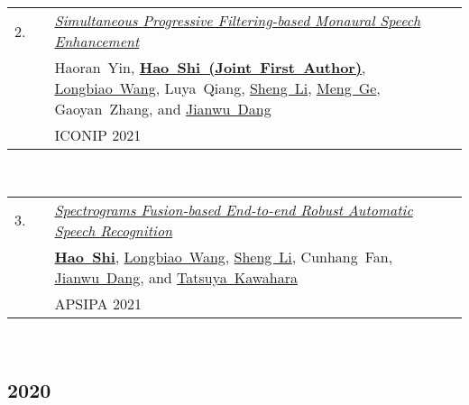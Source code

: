 \documentclass[11pt,letter,sans]{moderncv}
\begin{document}
\begin{minipage}{\textwidth}
\begin{tabular}{R{8mm}p{1mm}L{6.5in}}
 2.\hspace*{1mm} && \textit{\href{https://hshi-speech.github.io/resume/pdf/SaSD.pdf}{Simultaneous Progressive Filtering-based Monaural Speech Enhancement} }  \\
 && \mbox{Haoran Yin}, \mbox{\textbf{\href{https://scholar.google.com/citations?user=DclFbLwAAAAJ}{Hao Shi (Joint First Author)}}}, \mbox{\href{https://scholar.google.com/citations?user=1Z9_5ZgAAAAJ}{Longbiao Wang}}, \mbox{Luya Qiang}, \mbox{\href{https://scholar.google.com/citations?user=zHAhs0IAAAAJ}{Sheng Li}}, \mbox{\href{https://scholar.google.com/citations?user=Ody4GF0AAAAJ}{Meng Ge}}, \mbox{Gaoyan Zhang}, and \mbox{\href{https://scholar.google.com/citations?user=Wk5ApskAAAAJ}{Jianwu Dang}} \\
 && ICONIP 2021  \\
\end{tabular} \\[2mm]
\end{minipage}

\begin{minipage}{\textwidth}
\begin{tabular}{R{8mm}p{1mm}L{6.5in}}
 3.\hspace*{1mm} && \textit{\href{https://hshi-speech.github.io/resume/pdf/APSIPA-2021.pdf}{Spectrograms Fusion-based End-to-end Robust Automatic Speech Recognition} }  \\
 && \mbox{\textbf{\href{https://scholar.google.com/citations?user=DclFbLwAAAAJ}{Hao Shi}}}, \mbox{\href{https://scholar.google.com/citations?user=1Z9_5ZgAAAAJ}{Longbiao Wang}}, \mbox{\href{https://scholar.google.com/citations?user=zHAhs0IAAAAJ}{Sheng Li}}, \mbox{Cunhang Fan}, \mbox{\href{https://scholar.google.com/citations?user=Wk5ApskAAAAJ}{Jianwu Dang}}, and \mbox{\href{https://scholar.google.com/citations?user=o3AmlFYAAAAJ}{Tatsuya Kawahara}} \\
 && APSIPA 2021  \\
\end{tabular} \\[2mm]
\end{minipage}
\subsection{2020}
\end{document}
